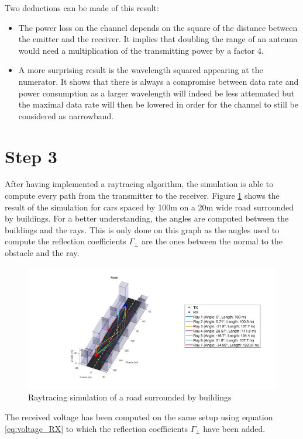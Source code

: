 \documentclass[10pt,a4paper]{ULBreport}
\begin{document}
Two deductions can be made of this result: 
\begin{itemize}
    \item The power loss on the channel depends on the square of the distance between the emitter and the receiver. It implies that doubling the range of an antenna would need a multiplication of the transmitting power by a factor 4.
    \item A more surprising result is the wavelength squared appearing at the numerator. It shows that there is always a compromise between data rate and power consumption as a larger wavelength will indeed be less attenuated but the maximal data rate will then be lowered in order for the channel to still be considered as narrowband.
\end{itemize}

\section{Step 3}

After having implemented a raytracing algorithm, the simulation is able to compute every path from the transmitter to the receiver. Figure \ref{fig:raytracingDemo} shows the result of the simulation for cars spaced by 100m on a 20m wide road surrounded by buildings. For a better understanding, the angles are computed between the buildings and the rays. This is only done on this graph as the angles used to compute the reflection coefficients $\Gamma_{\perp}$ are the ones between the normal to the obstacle and the ray.

\begin{figure}[H]
    \centering
    \includegraphics[width=1\textwidth]{3_1.png}
    \caption{Raytracing simulation of a road surrounded by buildings}
    \label{fig:raytracingDemo}
\end{figure}

The received voltage has been computed on the same setup using equation \ref{eq:voltage_RX} to which the reflection coefficients $\Gamma_{\perp}$ have been added. 
\end{document}
